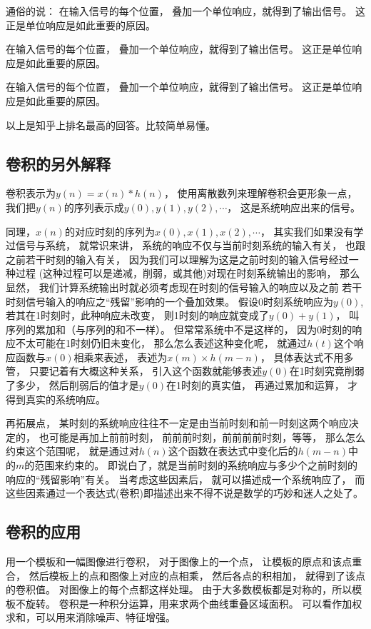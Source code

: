 通俗的说：%
在输入信号的每个位置，%
叠加一个单位响应，就得到了输出信号。%
这正是单位响应是如此重要的原因。%

在输入信号的每个位置，%
叠加一个单位响应，就得到了输出信号。%
这正是单位响应是如此重要的原因。%

在输入信号的每个位置，%
叠加一个单位响应，就得到了输出信号。%
这正是单位响应是如此重要的原因。%

以上是知乎上排名最高的回答。比较简单易懂。%

\subsection{卷积的另外解释}
卷积表示为$y(n)=x(n)*h(n)$，%
使用离散数列来理解卷积会更形象一点，%
我们把$y(n)$的序列表示成$y(0),y(1),y(2),\cdots$，%
这是系统响应出来的信号。%

同理，$x(n)$的对应时刻的序列为$x(0),x(1),x(2),\cdots$，%
其实我们如果没有学过信号与系统，%
就常识来讲，%
系统的响应不仅与当前时刻系统的输入有关，%
也跟之前若干时刻的输入有关，%
因为我们可以理解为这是之前时刻的输入信号经过一种过程%
(这种过程可以是递减，削弱，或其他)对现在时刻系统输出的影响，%
那么显然，%
我们计算系统输出时就必须考虑现在时刻的信号输入的响应以及之前%
若干时刻信号输入的响应之“残留”影响的一个叠加效果。%
假设0时刻系统响应为$y(0)$,%
若其在1时刻时，此种响应未改变，%
则1时刻的响应就变成了$y(0)+y(1)$，%
叫序列的累加和（与序列的和不一样）。%
但常常系统中不是这样的，%
因为0时刻的响应不太可能在1时刻仍旧未变化，%
那么怎么表述这种变化呢，%
就通过$h(t)$这个响应函数与$x(0)$相乘来表述，%
表述为$x(m)×h(m−n)$，%
具体表达式不用多管，%
只要记着有大概这种关系，%
引入这个函数就能够表述$y(0)$在1时刻究竟削弱了多少，%
然后削弱后的值才是$y(0)$在1时刻的真实值，%
再通过累加和运算，%
才得到真实的系统响应。%

再拓展点，%
某时刻的系统响应往往不一定是由当前时刻和前一时刻这两个响应决定的，%
也可能是再加上前前时刻，%
前前前时刻，前前前前时刻，等等，%
那么怎么约束这个范围呢，%
就是通过对$h(n)$这个函数在表达式中变化后的$h(m−n)$中的$m$的范围来约束的。%
即说白了，就是当前时刻的系统响应与多少个之前时刻的响应的“残留影响”有关。%
当考虑这些因素后，%
就可以描述成一个系统响应了，%
而这些因素通过一个表达式(卷积)即描述出来不得不说是数学的巧妙和迷人之处了。%

\subsection{卷积的应用}
用一个模板和一幅图像进行卷积，%
对于图像上的一个点，%
让模板的原点和该点重合，%
然后模板上的点和图像上对应的点相乘，%
然后各点的积相加，%
就得到了该点的卷积值。%
对图像上的每个点都这样处理。%
由于大多数模板都是对称的，所以模板不旋转。%
卷积是一种积分运算，用来求两个曲线重叠区域面积。%
可以看作加权求和，可以用来消除噪声、特征增强。

